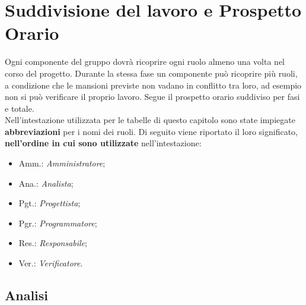 
\section{Suddivisione del lavoro e Prospetto Orario} 


Ogni componente del gruppo dovrà ricoprire ogni ruolo almeno una volta nel corso del progetto.
Durante la stessa fase un componente può ricoprire più ruoli, a condizione che le mansioni previste non vadano in conflitto tra loro, ad esempio non si può verificare il proprio lavoro.
Segue il prospetto orario suddiviso per fasi e totale. \\

Nell'intestazione utilizzata per le tabelle di questo capitolo sono state impiegate \textbf{abbreviazioni} per i nomi dei ruoli.
Di seguito viene riportato il loro significato, \textbf{nell'ordine in cui sono utilizzate} nell'intestazione:
\begin{itemize}
\item Amm.: \textit{Amministratore};
\item Ana.: \textit{Analista};
\item Pgt.: \textit{Progettista};
\item Pgr.: \textit{Programmatore};
\item Res.: \textit{Responsabile};
\item Ver.: \textit{Verificatore}.
\end{itemize}

\pagebreak
\subsection{Analisi}

